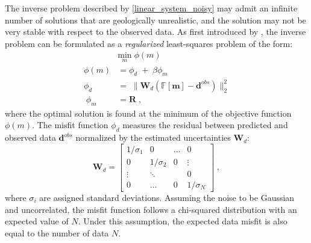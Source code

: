 The inverse problem described by \ref{linear_system_noisy} may admit an infinite number of solutions that are geologically unrealistic, and the solution may not be very stable with respect to the observed data.
As first introduced by \cite{TikhonovArsenin77}, the inverse problem can be formulated as a \emph{regularized} least-squares problem of the form:
\begin{equation}\label{Reg_Least_Squares}
\begin{split}
&\underset{m}{\text{min}} \; \phi(m)  \\
 \phi(m) &= \phi_d \;+\; \beta \phi_m \\
	\phi_d \; &= \;  \|\mathbf{W}_d \left( \mathbb{F}[\mathbf{m}] - \mathbf{d}^{obs} \right)\|_2^2 \\
	\;\phi_m \; &=  \mathbf{R}   \;,
	\end{split}
\end{equation}
where the optimal solution is found at the minimum of the objective function $\phi(m)$. 
The misfit function $\phi_d$ measures the residual between predicted and observed data $\mathbf{d}^{obs}$ normalized by the estimated uncertainties $\mathbf{W}_d$:
\begin{equation}\label{Wd}
\mathbf{W}_d = 
		\begin{bmatrix}
			1/\sigma_1 		& 		0		& \dots  		&  0 \\
			0 		&   	1/\sigma_2	&  0 	&  \vdots \\
			\vdots	&  		 \ddots	&  	   &  0\\
			0 		& 	\dots		& 		0	 &1/\sigma_N 
		 \end{bmatrix} \;,
\end{equation}
where $\sigma_i$ are assigned standard deviations.
Assuming the noise to be Gaussian and uncorrelated, the misfit function follows a chi-squared distribution with an expected value of $N$.
Under this assumption, the expected data misfit is also equal to the number of data $N$.

